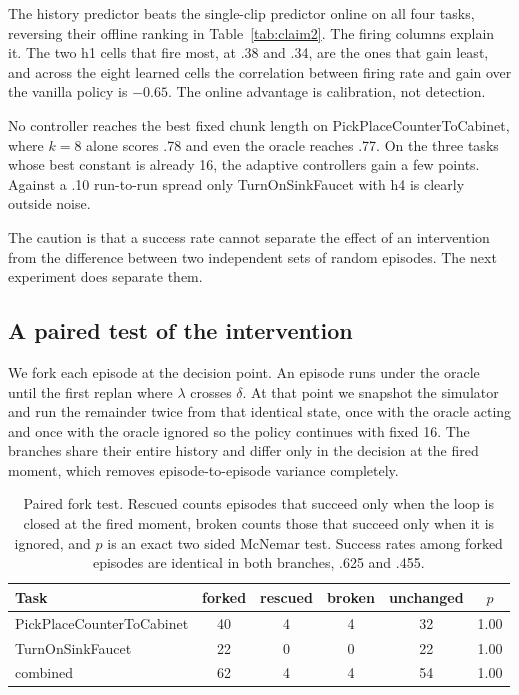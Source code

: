 The history predictor beats the single-clip predictor online on all four
tasks, reversing their offline ranking in Table~\ref{tab:claim2}. The firing
columns explain it. The two h1 cells that fire most, at .38 and .34, are the
ones that gain least, and across the eight learned cells the correlation
between firing rate and gain over the vanilla policy is $-0.65$. The online
advantage is calibration, not detection.

No controller reaches the best fixed chunk length on
PickPlaceCounterToCabinet, where $k{=}8$ alone scores .78 and even the oracle
reaches .77. On the three tasks whose best constant is already 16, the adaptive
controllers gain a few points. Against a .10 run-to-run spread only
TurnOnSinkFaucet with h4 is clearly outside noise.

The caution is that a success rate cannot separate the effect of an
intervention from the difference between two independent sets of random
episodes. The next experiment does separate them.

\subsection{A paired test of the intervention}

We fork each episode at the decision point. An episode runs under the oracle
until the first replan where $\lambda$ crosses $\delta$. At that point we
snapshot the simulator and run the remainder twice from that identical state,
once with the oracle acting and once with the oracle ignored so the policy
continues with fixed 16. The branches share their entire history and differ
only in the decision at the fired moment, which removes episode-to-episode
variance completely.

\begin{table}[t]
\centering
\small
\begin{tabular}{lccccc}
\toprule
Task & forked & rescued & broken & unchanged & $p$ \\
\midrule
PickPlaceCounterToCabinet & 40 & 4 & 4 & 32 & 1.00 \\
TurnOnSinkFaucet & 22 & 0 & 0 & 22 & 1.00 \\
\midrule
combined & 62 & 4 & 4 & 54 & 1.00 \\
\bottomrule
\end{tabular}
\caption{Paired fork test. Rescued counts episodes that succeed only when the
loop is closed at the fired moment, broken counts those that succeed only when
it is ignored, and $p$ is an exact two sided McNemar test. Success rates among
forked episodes are identical in both branches, .625 and .455.}
\label{tab:fork}
\end{table}

